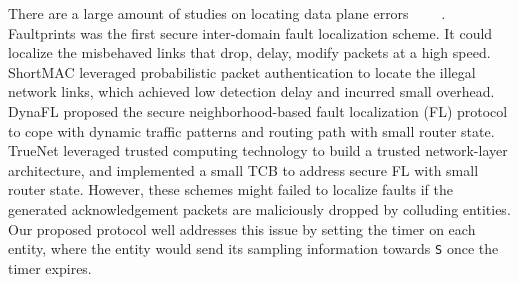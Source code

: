 There are a large amount of studies on locating data plane errors~\cite{basescu2016high}~\cite{zhang2012shortmac}~\cite{zhang2012secure}~\cite{zhang2011network} \cite{wang2017smartfix}. Faultprints \cite{basescu2016high} was the first secure inter-domain fault localization scheme. It could localize the misbehaved links that drop, delay, modify packets at a high speed. ShortMAC \cite{zhang2012shortmac} leveraged probabilistic packet authentication to locate the illegal network links, which achieved low detection delay and incurred small overhead. DynaFL \cite{zhang2012secure} proposed the secure neighborhood-based fault localization (FL) protocol to  cope with dynamic traffic patterns and routing path with small router state. TrueNet \cite{zhang2011network} leveraged trusted computing technology to build a trusted network-layer architecture, and implemented a small TCB to address secure FL with small router state. However, these schemes might failed to localize faults if the generated acknowledgement packets are maliciously dropped by colluding entities. Our proposed protocol well addresses this issue by setting the timer on each entity, where the entity would send its sampling information towards {\tt S} once the timer expires. 